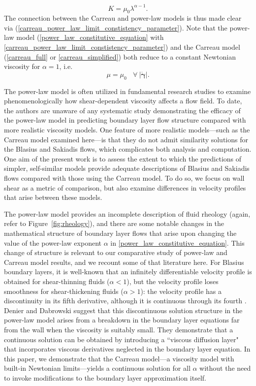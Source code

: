 \documentclass{article}
\newcommand{\gd}{{\dot{\bm{\gamma}}}}
\begin{document}
\begin{subequations}
\begin{equation}
    K = \mu_0 \lambda^{\alpha-1}. \label{carreau_power_law_limit_constistency_parameter}
\end{equation} \end{subequations} The connection between the Carreau and power-law models is thus made clear via (\ref{carreau_power_law_limit_constistency_parameter}). Note that the power-law model (\eqref{power_law_constitutive_equation} with \eqref{carreau_power_law_limit_constistency_parameter}) and the Carreau model (\eqref{carreau_full} or \eqref{carreau_simplified}) both reduce to a constant Newtonian viscosity for $\alpha=1$, i.e. \begin{equation}
    \mu = \mu_0 ~~~~\forall ~ |\gd|. \label{newtonian_viscosity}
\end{equation}

The power-law model is often utilized in fundamental research studies to examine phenomenologically how shear-dependent viscosity affects a flow field.  To date, the authors are unaware of any systematic study demonstrating the efficacy of the power-law model in predicting boundary layer flow structure compared with more realistic viscosity models. One feature of more realistic models---such as the Carreau model examined here---is that they do not admit similarity solutions for the Blasius and Sakiadis flows, which complicates both analysis and computation.  One aim of the present work is to assess the extent to which the predictions of simpler, self-similar models provide adequate descriptions of Blasius and Sakiadis flows compared with those using the Carreau model.  To do so, we focus on wall shear as a metric of comparison, but also examine differences in velocity profiles that arise between these models.

The power-law model provides an incomplete description of fluid rheology (again, refer to Figure~\ref{fig:rheology}), and there are some notable changes in the mathematical structure of boundary layer flows that arise upon changing the value of the power-law exponent $\alpha$ in \eqref{power_law_constitutive_equation}.  This change of structure is relevant to our comparative study of power-law and Carreau model results, and we recount some of that literature here.  For Blasius boundary layers, it is well-known that an infinitely differentiable velocity profile is obtained for shear-thinning fluids ($\alpha < 1$), but the velocity profile loses smoothness for shear-thickening fluids ($\alpha>1$): the velocity profile has a discontinuity in its fifth derivative, although it is continuous through its fourth \cite{Zhizhin1978-us, Pavlov1982-qh}. Denier and Dabrowski \cite{Dabrowski} suggest that this discontinuous solution structure in the power-law model arises from a breakdown in the boundary layer equations far from the wall when the viscosity is suitably small.  They demonstrate that a continuous solution can be obtained by introducing a ``viscous diffusion layer" that incorporates viscous derivatives neglected in the boundary layer equation. In this paper, we demonstrate that the Carreau model---a viscosity model with built-in Newtonian limits---yields a continuous solution for all $\alpha$ without the need to invoke modifications to the boundary layer approximation itself.
\end{document}

